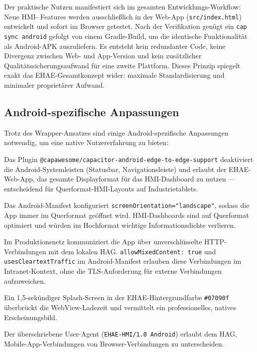 ﻿\documentclass[12pt,a4paper]{article}
\begin{document}
Der praktische Nutzen manifestiert sich im gesamten Entwicklungs-Workflow: Neue HMI-%
Features werden ausschlie\ss{}lich in der Web-App (\texttt{src/index.html}) entwickelt
und sofort im Browser getestet. Nach der Verifikation genügt ein \texttt{cap sync
android} gefolgt von einem Gradle-Build, um die identische Funktionalität als
Android-APK auszuliefern. Es entsteht kein redundanter Code, keine Divergenz zwischen
Web- und App-Version und kein zusätzlicher Qualitätssicherungsaufwand für eine zweite
Plattform. Dieses Prinzip spiegelt exakt das EHAE-Gesamtkonzept wider: maximale
Standardisierung und minimaler proprietärer Aufwand.

\subsection{Android-spezifische Anpassungen}

Trotz des Wrapper-Ansatzes sind einige Android-spezifische Anpassungen notwendig, um
eine native Nutzererfahrung zu bieten:

\begin{description}[leftmargin=2em]
  \item[Edge-to-Edge-Darstellung] Das Plugin
    \texttt{@capawesome/capacitor-android-edge-to\newline -edge-support} deaktiviert die
    Android-Systemleisten (Statusbar, Navigationsleiste) und erlaubt der EHAE-Web-App,
    das gesamte Displayformat für das HMI-Dashboard zu nutzen --- entscheidend für
    Querformat-HMI-Layouts auf Industrietablets.
  \item[Querformat-Fixierung] Das Android-Manifest konfiguriert
    \texttt{screenOrientation="{}land\newline scape"{}}, sodass die App immer im Querformat
    geöffnet wird. HMI-Dashboards sind auf Querformat optimiert und würden im
    Hochformat wichtige Informationsdichte verlieren.
  \item[Intranet-Verbindungen] Im Produktionsnetz kommuniziert die App über
    unverschlüsselte HTTP-Verbindungen mit dem lokalen HAG.
    \texttt{allowMixedContent: true} und \texttt{usesCleartextTraffic} im
    Android-Manifest erlauben diese Verbindungen im Intranet-Kontext, ohne die
    TLS-Anforderung für externe Verbindungen aufzuweichen.
  \item[Splash-Screen] Ein 1{,}5-sekündiger Splash-Screen in der EHAE-Hintergrundfarbe
    \texttt{\#07090f} überbrückt die WebView-Ladezeit und vermittelt ein
    professionelles, natives Erscheinungsbild.
  \item[User-Agent-Identifikation] Der überschriebene User-Agent
    (\texttt{EHAE-HMI/1.0 Android}) erlaubt dem HAG, Mobile-App-Verbindungen
    von Browser-Verbindungen zu unterscheiden.
\end{description}
\end{document}
